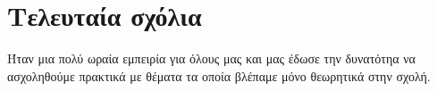 \section{Τελευταία σχόλια}
Ήταν μια πολύ ωραία εμπειρία για όλους μας και μας έδωσε την δυνατότηα να ασχοληθούμε πρακτικά με θέματα τα οποία βλέπαμε μόνο θεωρητικά στην σχολή.
